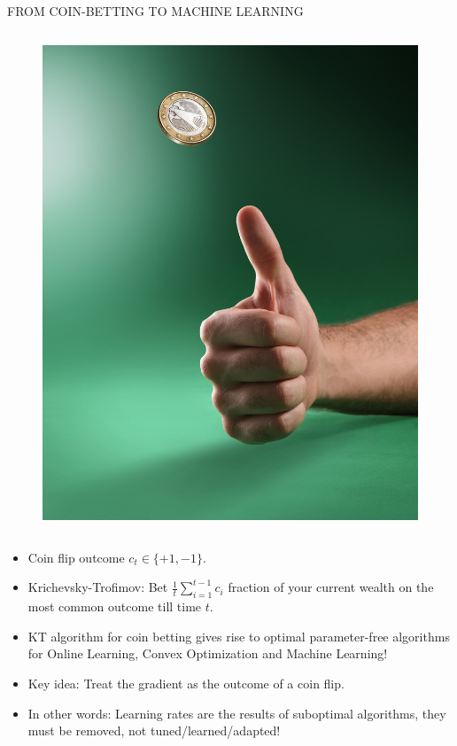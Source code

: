 \documentclass[final,t,serif,mathserif]{beamer}
\begin{document}
\begin{frame}{}
\begin{columns}[t]
\begin{column}{.33\linewidth}
\begin{block}{FROM COIN-BETTING TO MACHINE LEARNING}
\begin{columns}[c]
\begin{column}{7cm}
\begin{figure}
			\includegraphics[width=\linewidth]{figs/coin_toss}
		\end{figure}
	\end{column}
    \end{columns}

    \vspace{1cm}

    \begin{itemize}
      \item Coin flip outcome $c_t \in \{+1, -1\}$.
      \item Krichevsky-Trofimov: Bet $\tfrac{1}{t} \sum_{i=1}^{t-1} c_i$ fraction of your current wealth on the most common outcome till time $t$.
      \item \alert{KT algorithm for coin betting gives rise to optimal parameter-free algorithms for Online Learning, Convex Optimization and Machine Learning!}
      \item Key idea: Treat the gradient as the outcome of a coin flip.
      \item In other words: \alert{Learning rates are the results of suboptimal algorithms, they must be removed, not tuned/learned/adapted!}
    \end{itemize}
    

\end{block}
\end{column}
\end{columns}
\end{frame}
\end{document}
